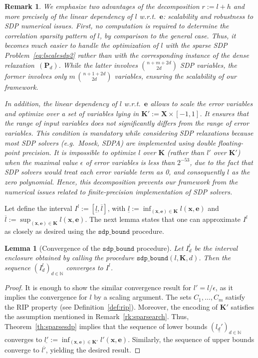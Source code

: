 \documentclass[preprint]{sigplanconf}
\newcommand{\N}{\mathbb{N}}
\newcommand{\x}{\mathbf{x}}
\newcommand{\e}{\mathbf{e}}
\def\P{\mathbf{P}}
\def\K{\mathbf{K}}
\def\X{\mathbf{X}}
\newcommand{\sdpboundfun}[3]{\mathtt{sdp\_bound}(#1, #2, #3)}
\newcommand{\sdpbound}{\mathtt{sdp\_bound}}
\newtheorem{lemma}[theorem]{Lemma}
\theoremstyle{plain}
\newtheorem{remark}{Remark}
\begin{document}
%
\begin{remark}
We emphasize two advantages of the decomposition $r := l + h$ and more precisely of the linear dependency of $l$ w.r.t.~$\e$: scalability and robustness to SDP numerical issues.
First, no computation is required to determine the correlation sparsity pattern of $l$, by comparison to the general case. Thus, it becomes much easier to handle the optimization of $l$ with the sparse SDP Problem~\eqref{eq:lscalesdp2} rather than with the corresponding instance of the dense relaxation~$(\P_d)$. While the latter involves $\binom{n + m+ 2 d}{2 d}$ SDP variables, the former involves only $m \, \binom{n + 1 + 2 d}{2 d}$ variables, ensuring the scalability of our framework.

In addition, the linear dependency of $l$ w.r.t.~$\e$ allows to scale the error variables and optimize over a set of variables lying in $\K' := \X \times [-1, 1]$. It ensures that the range of input variables does not significantly differs from the range of error variables. This condition is mandatory while considering SDP relaxations because most SDP solvers (e.g.~{\sc Mosek}, {\sc SDPA}) are implemented using double floating-point precision. It is impossible to optimize $l$ over $\K$ (rather than $l'$ over $\K'$) when the maximal value $\epsilon$ of error variables is less than $2^{-53}$, due to the fact that SDP solvers would treat each error variable term as 0, and consequently $l$ as the zero polynomial. Hence, this decomposition prevents our framework from the numerical issues related to finite-precision implementation of SDP solvers.
\end{remark}
Let define the interval $I^l := [\underline{l}, \overline{l}]$, with $\underline{l} := \inf_{(\x,\e) \in \K} l(\x,\e)$ and $\overline{l} := \sup_{(\x,\e) \in \K} l(\x,\e)$.
The next lemma states that one can approximate $I^l$ as closely as desired using the $\sdpbound$ procedure.
\begin{lemma}[Convergence of the $\sdpbound$ procedure]
\label{th:cvg_sdpbound}
Let $I_d^l$ be the interval enclosure obtained by calling the procedure $\sdpboundfun{l}{\K}{d}$. Then the sequence $(I_d^l)_{d \in \N}$ converges to $I^l$.
\end{lemma}
%
\begin{proof}
It is enough to show the similar convergence result for $l' = l/\epsilon$, as it implies the convergence for $l$ by a scaling argument.
The sets $C_1,\dots, C_m$ satisfy the RIP property (see Definition~\ref{def:rip}). Moreover, the encoding of $\K'$ satisfies the assumption mentioned in Remark~\ref{rk:sparsearch}. Thus, Theorem~\ref{th:sparsesdp} implies that the sequence of lower bounds $(\underline{l_d'})_{d \in \N}$ converges to $\underline{l'} := \inf_{(\x,\e) \in \K'} l'(\x,\e)$. Similarly, the sequence of upper bounds converge to $\overline{l'}$, yielding the desired result.
\end{proof}
\end{document}
